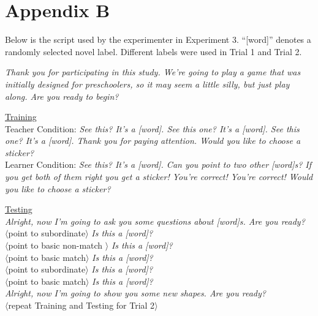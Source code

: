 \documentclass[man]{apa2}
\begin{document}
\section{Appendix B}
Below is the script used by the experimenter in Experiment 3. ``[word]'' denotes a randomly selected novel label. Different labels were used in Trial 1 and Trial 2. 

\vspace{5mm}

{\it Thank you for participating in this study. We're going to play a game that was initially designed for preschoolers, so it may seem a little silly, but just play along. Are you ready to begin?}
\vspace{2.5mm}

\noindent \underline{Training} \\
	Teacher Condition:  {\it See this? It's a [word]. See this one? It's a [word]. See this one? It's a [word]. Thank you for paying attention. Would you like to choose a sticker? }
\\
Learner Condition:  {\it See this? It's a [word].  Can you point to two other [word]s? If you get both of them right you get a sticker!  You're correct!  You're correct! Would you like to choose a sticker? }
\vspace{2.5mm}
 
\noindent  \underline{Testing} \\
{\it Alright, now I'm going to ask you some questions about [word]s. Are you ready?} \\
$\langle$point to subordinate$\rangle$ {\it Is this a [word]?} \\
$\langle$point to basic non-match $\rangle$ {\it  Is this a [word]?} \\
$\langle$point to basic match$\rangle$ {\it Is this a [word]?}\\
$\langle$point to subordinate$\rangle$ {\it Is this a [word]?} \\
$\langle$point to basic match$\rangle$ {\it Is this a [word]?} \\
 
{\it Alright, now I'm going to show you some new shapes. Are you ready?}\\

\vspace{2.5mm}
\noindent $\langle$repeat Training and Testing for Trial 2$\rangle$ \\


\nocite{sanchez2003effect}




\newpage
\theappendix 
\end{document}
